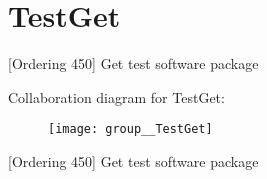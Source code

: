 \hypertarget{group__TestGet}{\section{Test\-Get}
\label{group__TestGet}
}


\mbox{[}Ordering 450\mbox{]} Get test software package  


Collaboration diagram for Test\-Get\-:\nopagebreak
\begin{figure}[H]
\begin{center}
\leavevmode
\texttt{[image: group\_\_TestGet]}
\end{center}
\end{figure}
\mbox{[}Ordering 450\mbox{]} Get test software package 